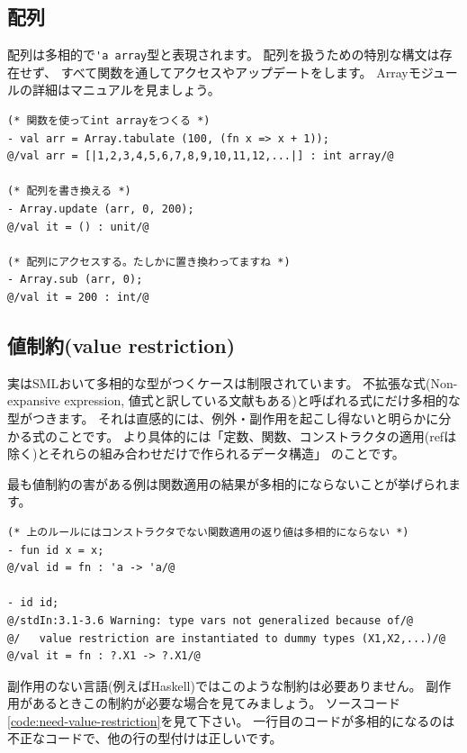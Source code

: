 \documentclass[11pt,a4paper]{article}
\begin{document}
\subsection{配列}

配列は多相的で\lstinline{'a array}型と表現されます。
配列を扱うための特別な構文は存在せず、
すべて関数を通してアクセスやアップデートをします。
Arrayモジュールの詳細はマニュアルを見ましょう\cite{sml-libs}。

\begin{lstlisting}[caption=配列の扱い,label=code:array]
(* 関数を使ってint arrayをつくる *)
- val arr = Array.tabulate (100, (fn x => x + 1));
@/val arr = [|1,2,3,4,5,6,7,8,9,10,11,12,...|] : int array/@

(* 配列を書き換える *)
- Array.update (arr, 0, 200);
@/val it = () : unit/@

(* 配列にアクセスする。たしかに置き換わってますね *)
- Array.sub (arr, 0);
@/val it = 200 : int/@
\end{lstlisting}

\subsection{値制約(value restriction)}

実はSMLおいて多相的な型がつくケースは制限されています。
不拡張な式(Non-expansive expression, 値式と訳している文献もある)と呼ばれる式にだけ多相的な型がつきます。
それは直感的には、例外・副作用を起こし得ないと明らかに分かる式のことです。
より具体的には「定数、関数、コンストラクタの適用(refは除く)とそれらの組み合わせだけで作られるデータ構造」
のことです。

最も値制約の害がある例は関数適用の結果が多相的にならないことが挙げられます。

\begin{lstlisting}[caption=値制約,label=code:value-description]
(* 上のルールにはコンストラクタでない関数適用の返り値は多相的にならない *)
- fun id x = x;
@/val id = fn : 'a -> 'a/@

- id id;
@/stdIn:3.1-3.6 Warning: type vars not generalized because of/@
@/   value restriction are instantiated to dummy types (X1,X2,...)/@
@/val it = fn : ?.X1 -> ?.X1/@
\end{lstlisting}

副作用のない言語(例えばHaskell)ではこのような制約は必要ありません。
副作用があるときこの制約が必要な場合を見てみましょう。
ソースコード\ref{code:need-value-restriction}を見て下さい。
一行目のコードが多相的になるのは不正なコードで、他の行の型付けは正しいです。
\end{document}
